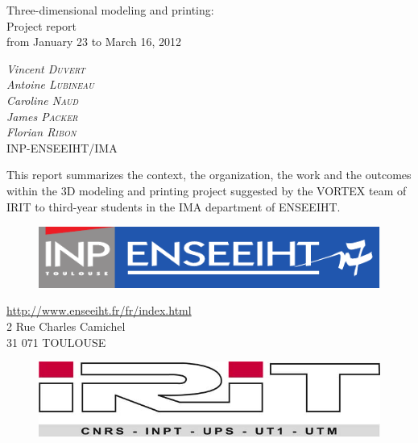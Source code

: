 \documentclass{report}
\begin{document}
\sloppy

\bigskip
\bigskip
\bigskip
\bigskip
\bigskip
\bigskip
\bigskip
\bigskip

\begin{center}
\huge{Three-dimensional modeling and printing:\\ Project report\\}
\bigskip
\bigskip
\Large{from January 23 to March 16, 2012}
\end{center}

\bigskip
\bigskip

\begin{center}
\large{
\textit{Vincent \textsc{Duvert} \\
Antoine \textsc{Lubineau} \\
Caroline \textsc{Naud} \\
James \textsc{Packer} \\
Florian \textsc{Ribon}} \\
\bigskip
INP-ENSEEIHT/IMA 
}
\end{center}

\bigskip
\bigskip

	This report summarizes the context, the organization, the work and the outcomes within the 3D modeling and printing project suggested by the VORTEX team of IRIT to third-year students in the IMA department of ENSEEIHT.

\bigskip
\bigskip

\begin{figure}[!h]
\begin{center}
	\includegraphics[scale=0.4]{inp-enseeiht}
\end{center}
\end{figure}

\bigskip

\begin{center}
\url{http://www.enseeiht.fr/fr/index.html} \\
2 Rue Charles Camichel \\
31 071 TOULOUSE
\end{center}

\vfill

\begin{figure}[!h]
\begin{center}
	\includegraphics[scale=0.4]{irit}
\end{center}
\end{figure}
\end{document}
